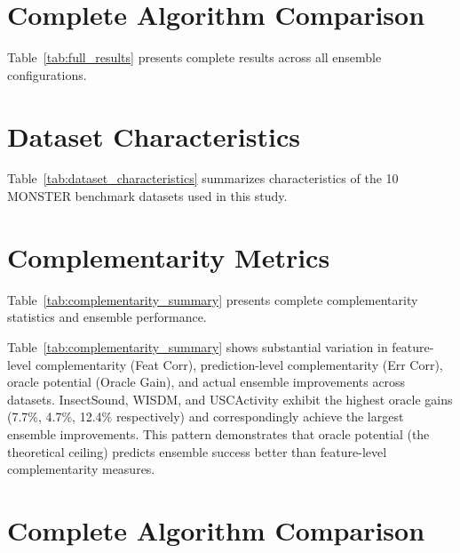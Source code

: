 \documentclass[pdflatex,sn-basic]{sn-jnl}           %
\theoremstyle{thmstyleone}%
\theoremstyle{thmstyletwo}%
\theoremstyle{thmstylethree}%
\begin{document}
\begin{appendices}

\section{Complete Algorithm Comparison}\label{appA}
\setcounter{table}{0}
\renewcommand{\thetable}{A}

Table~\ref{tab:full_results} presents complete results across all ensemble configurations.



\clearpage

\section{Dataset Characteristics}\label{appB}
\setcounter{table}{0}
\renewcommand{\thetable}{B}

Table~\ref{tab:dataset_characteristics} summarizes characteristics of the 10 MONSTER benchmark datasets used in this study.



\clearpage

\section{Complementarity Metrics}\label{appC}
\setcounter{table}{0}
\renewcommand{\thetable}{C}

Table~\ref{tab:complementarity_summary} presents complete complementarity statistics and ensemble performance.



Table~\ref{tab:complementarity_summary} shows substantial variation in feature-level complementarity (Feat Corr), prediction-level complementarity (Err Corr), oracle potential (Oracle Gain), and actual ensemble improvements across datasets. InsectSound, WISDM, and USCActivity exhibit the highest oracle gains (7.7\%, 4.7\%, 12.4\% respectively) and correspondingly achieve the largest ensemble improvements. This pattern demonstrates that oracle potential (the theoretical ceiling) predicts ensemble success better than feature-level complementarity measures.

\clearpage

\section{Complete Algorithm Comparison}\label{appD}
\setcounter{figure}{0}
\renewcommand{\thefigure}{D}


\end{appendices}
\end{document}
